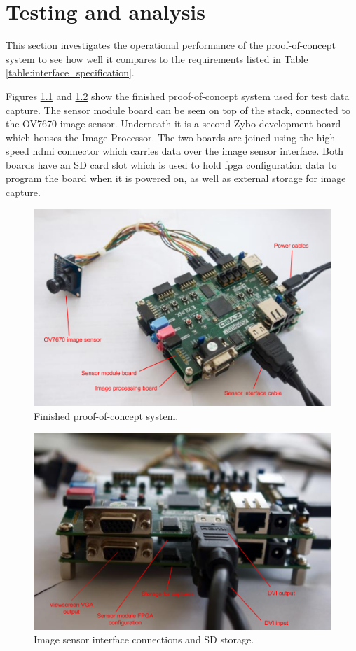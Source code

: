 \chapter{Testing and analysis}

This section investigates the operational performance of the proof-of-concept system to see how well it compares to the requirements listed in Table \ref{table:interface_specification}.

Figures \ref{fig:zybo_top} and \ref{fig:zybo_front} show the finished proof-of-concept system used for test data capture. The sensor module board can be seen on top of the stack, connected to the OV7670 image sensor. Underneath it is a second Zybo development board which houses the Image Processor. The two boards are joined using the high-speed \gls{hdmi} connector which carries data over the image sensor interface. Both boards have an SD card slot which is used to hold \gls{fpga} configuration data to program the board when it is powered on, as well as external storage for image capture.

\begin{figure}
  \centering
  \includegraphics[width=1\textwidth]{./img/zybo_top.png}
  \caption{Finished proof-of-concept system.}
  \label{fig:zybo_top}
\end{figure}

\begin{figure}
  \centering
  \includegraphics[width=1\textwidth]{./img/zybo_front.png}
  \caption{Image sensor interface connections and SD storage.}
  \label{fig:zybo_front}
\end{figure}
    
